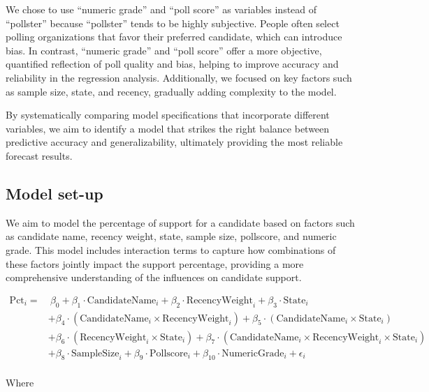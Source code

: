 \documentclass[
  letterpaper,
  DIV=11,
  numbers=noendperiod]{scrartcl}
\begin{document}
We chose to use ``numeric grade'' and ``poll score'' as variables
instead of ``pollster'' because ``pollster'' tends to be highly
subjective. People often select polling organizations that favor their
preferred candidate, which can introduce bias. In contrast, ``numeric
grade'' and ``poll score'' offer a more objective, quantified reflection
of poll quality and bias, helping to improve accuracy and reliability in
the regression analysis. Additionally, we focused on key factors such as
sample size, state, and recency, gradually adding complexity to the
model.

By systematically comparing model specifications that incorporate
different variables, we aim to identify a model that strikes the right
balance between predictive accuracy and generalizability, ultimately
providing the most reliable forecast results.

\hypertarget{model-set-up}{%
\subsection{Model set-up}\label{model-set-up}}

We aim to model the percentage of support for a candidate based on
factors such as candidate name, recency weight, state, sample size,
pollscore, and numeric grade. This model includes interaction terms to
capture how combinations of these factors jointly impact the support
percentage, providing a more comprehensive understanding of the
influences on candidate support.

\hfill\break
\begin{align*}
\mathrm{Pct}_i = &\ \beta_0 + \beta_1 \cdot \mathrm{Candidate Name}_i + \beta_2 \cdot \mathrm{Recency Weight}_i + \beta_3 \cdot \mathrm{State}_i \\
& + \beta_4 \cdot (\mathrm{Candidate Name}_i \times \mathrm{Recency Weight}_i) + \beta_5 \cdot (\mathrm{Candidate Name}_i \times \mathrm{State}_i) \\
& + \beta_6 \cdot (\mathrm{Recency Weight}_i \times \mathrm{State}_i) + \beta_7 \cdot (\mathrm{Candidate Name}_i \times \mathrm{Recency Weight}_i \times \mathrm{State}_i) \\
& + \beta_8 \cdot \mathrm{Sample Size}_i + \beta_9 \cdot \mathrm{Pollscore}_i + \beta_{10} \cdot \mathrm{Numeric Grade}_i + \epsilon_i
\end{align*}\\

Where
\end{document}
